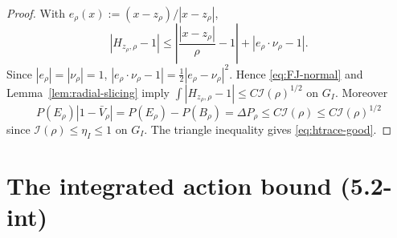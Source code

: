 \documentclass[11pt]{article}
\theoremstyle{definition}
\begin{document}
\begin{proof}
With $e_\rho(x):=(x-z_\rho)/|x-z_\rho|$,
\[
   |H_{z_\rho,\rho}-1|
   \le \left|\frac{|x-z_\rho|}{\rho}-1\right|
      + |e_\rho\cdot\nu_\rho-1|.
\]
Since $|e_\rho|=|\nu_\rho|=1$,
$|e_\rho\cdot\nu_\rho-1|=\frac12|e_\rho-\nu_\rho|^2$.  Hence
\eqref{eq:FJ-normal} and Lemma~\ref{lem:radial-slicing} imply
$\int|H_{z_\rho,\rho}-1|\le C\mathcal I(\rho)^{1/2}$ on $G_I$.  Moreover
\[
   P(E_\rho)|1-\bar V_\rho|=P(E_\rho)-P(B_\rho)=\Delta P_\rho
   \le C\mathcal I(\rho)\le C\mathcal I(\rho)^{1/2}
\]
since $\mathcal I(\rho)\le\eta_I\le 1$ on $G_I$.  The triangle
inequality gives \eqref{eq:htrace-good}.
\end{proof}

\section{The integrated action bound (5.2-int)}\label{sec:52int}
\end{document}
